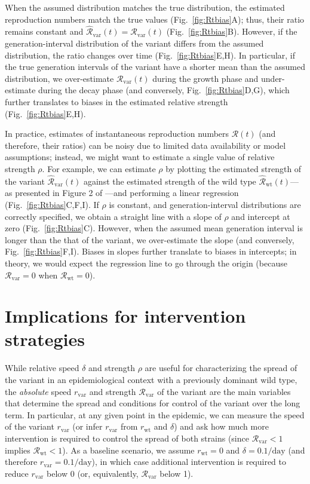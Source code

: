 \documentclass[12pt]{article}
\newcommand{\fref}[1]{Fig.~\ref{fig:#1}}
\newcommand{\vvvar}{\mathrm{var}}
\newcommand{\wwwt}{\mathrm{wt}}
\newcommand{\rx}[1]{\ensuremath{{r}_{#1}}\xspace}
\newcommand{\rw}{\rx{\wwwt}}
\newcommand{\rv}{\rx{\vvvar}}
\newcommand{\Rx}[1]{\ensuremath{{\mathcal R}_{#1}}\xspace}
\newcommand{\RR}{\ensuremath{{\mathcal R}}\xspace}
\newcommand{\Rw}{\Rx{\wwwt}}
\newcommand{\Rv}{\Rx{\vvvar}}
\newcommand{\pday}{\ensuremath{/\textrm{day}}}
\begin{document}
When the assumed distribution matches the true distribution, the estimated reproduction numbers match the true values (\fref{Rtbias}A); thus, their ratio remains constant and $\hat{\RR}_{\textrm{var}}(t)=\Rv(t)$ (\fref{Rtbias}B).
However, if the generation-interval distribution of the variant differs from the assumed distribution, the ratio changes over time (\fref{Rtbias}E,H).
In particular, if the true generation intervals of the variant have a shorter mean than the assumed distribution, we over-estimate $\Rv(t)$ during the growth phase and under-estimate during the decay phase (and conversely, \fref{Rtbias}D,G), which further translates to biases in the estimated relative strength (\fref{Rtbias}E,H).

In practice, estimates of instantaneous reproduction numbers $\RR(t)$ (and therefore, their ratios) can be noisy due to limited data availability or model assumptions;
instead, we might want to estimate a single value of relative strength $\rho$.
For example, we can estimate $\rho$ by plotting the estimated strength of the variant $\hat{\RR}_{\textrm{var}}(t)$ against the estimated strength of the wild type $\hat{\RR}_{\textrm{wt}}(t)$---as presented in Figure 2 of \cite{volz2021transmission}---and performing a linear regression (\fref{Rtbias}C,F,I).
If $\rho$ is constant, and generation-interval distributions are correctly specified, we obtain a straight line with a slope of $\rho$ and intercept at zero (\fref{Rtbias}C).
However, when the assumed mean generation interval is longer than the that of the variant, we over-estimate the slope (and conversely, \fref{Rtbias}F,I).
Biases in slopes further translate to biases in intercepts; in theory, we would expect the regression line to go through the origin (because $\Rv = 0$ when $\Rw = 0$).

\section{Implications for intervention strategies}

While relative speed $\delta$ and strength $\rho$ are useful for characterizing the spread of the variant in an epidemiological context with a previously dominant wild type, the \emph{absolute} speed $\rv$ and strength $\Rv$ of the variant are the main variables that determine the spread and conditions for control of the variant over the long term.
In particular, at any given point in the epidemic, we can measure the speed of the variant $\rv$ (or infer $\rv$ from $\rw$ and $\delta$) and ask how much more intervention is required to control the spread of both strains (since $\Rv < 1$ implies $\Rw < 1$).
As a baseline scenario, we assume $\rw=0$ and $\delta=0.1\pday$ (and therefore $\rv=0.1\pday$), in which case additional intervention is required to reduce $\rv$ below 0 (or, equivalently, $\Rv$ below 1).
\end{document}
